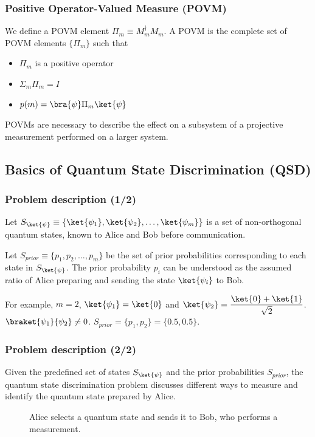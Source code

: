 \documentclass{beamer}
\begin{document}
\begin{frame}
    \label{frame:povm}
    \frametitle{Positive Operator-Valued Measure (POVM)}
    We define a POVM element $\Pi_{m} \equiv M_{m}^{\dagger} M_{m}$.
    A POVM is the complete set of POVM elements $\{\Pi_{m}\}$ such that
    \begin{itemize}
        \item $\Pi_{m}$ is a positive operator
        \item $\Sigma_{m} \Pi_{m} = I$
        \item $p(m) = \bra{\psi} \Pi_{m} \ket{\psi}$
    \end{itemize}

    \begin{center}
        \scalebox{0.8}{
            
        }
    \end{center}

    POVMs are necessary to describe the effect on a subsystem of a
    projective measurement performed on a larger system.
\end{frame}


\subsection{Basics of Quantum State Discrimination (QSD)}

\begin{frame}
    \frametitle{Problem description (1/2)}
    Let $S_{\ket{\psi}} \equiv \{\ket{\psi_{1}}, \ket{\psi_{2}}, \dots, \ket{\psi_{m}}\}$
    is a set of non-orthogonal quantum states, known to Alice and Bob before
    communication.
    \vspace*{0.2cm}

    Let $S_{prior} \equiv \{p_{1}, p_{2}, \dots, p_{m}\}$ be the set of prior
    probabilities corresponding to each state in $S_{\ket{\psi}}$.
    The prior probability $p_{i}$ can be understood as the assumed ratio of Alice
    preparing and sending the state $\ket{\psi_{i}}$ to Bob.
    \vspace*{0.2cm}

    For example, $m = 2$, $\ket{\psi_{1}} = \ket{0}$ and
    $\ket{\psi_{2}} = \dfrac{\ket{0}+\ket{1}}{\sqrt{2}}$.
    $\braket{\psi_{1}}{\psi_{2}} \neq 0$.
    $S_{prior} = \{p_{1}, p_{2}\} = \{0.5, 0.5\}$.
\end{frame}

\begin{frame}
    \frametitle{Problem description (2/2)}
    Given the predefined set of states $S_{\ket{\psi}}$ and the prior probabilities
    $S_{prior}$, the quantum state discrimination problem discusses different
    ways to measure and identify the quantum state prepared by Alice.

    \begin{figure}
        \centering
        \scalebox{0.55}{
            
        }
        \caption{Alice selects a quantum state and sends it to Bob, who performs a measurement.}
    \end{figure}
\end{frame}
\end{document}
